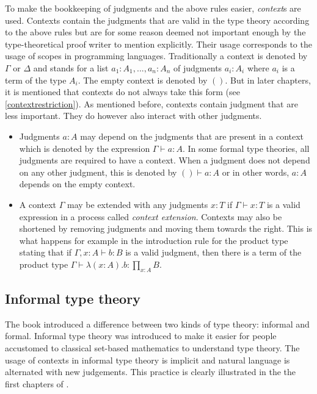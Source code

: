 \documentclass[11pt,a4paper,twoside,xetex,draft]{book}
\newcommand{\keyword}[1]{\emph{#1}\index{#1}}
\begin{document}
To make the bookkeeping of judgments and the above  rules easier, \keyword{context}s are used. Contexts contain the judgments that are valid in the type theory according to the above rules but are for some reason deemed not important enough by the type-theoretical proof writer to mention explicitly. Their usage corresponds to the usage of scopes in programming languages. Traditionally a context is denoted by $\Gamma$ or $\Delta$ and stands for a list $a_1:A_1,...,a_n:A_n$ of judgments $a_i : A_i$ where $a_i$ is a term of the type $A_i$.  The empty context is denoted by $()$. But in later chapters, it is mentioned that contexts do not always take this form (see \cref{contextrestriction}). As mentioned before, contexts contain judgment that are less important. They do however also interact with other judgments.

\begin{itemize}
\item Judgments $a : A$ may depend on the judgments that are present in a context which is denoted by the expression $\Gamma \vdash a : A$. In some formal type theories, all judgments are required to have a context. When a judgment does not depend on any other judgment, this is denoted by $() \vdash a : A$ or in other words, $a : A$ depends on the empty context.  
\item A context $\Gamma$ may be extended with any judgments $x:T$ if $\Gamma \vdash x : T$ is a valid expression in a process called \keyword{context extension}. Contexts may also be shortened by removing judgments and moving them towards the right. This is what happens for example in the introduction rule for the product type stating that if $\Gamma , x : A \vdash b : B$ is a valid judgment, then there is a term of the product type $\Gamma \vdash \lambda (x : A) . b : \prod_{x : A} B$.
\end{itemize}




\subsection{Informal type theory}

The book \cite{Voevodsky2013} introduced a difference between two kinds of type theory: informal and formal. Informal type theory was introduced to make it easier for people accustomed to classical set-based mathematics to understand type theory. The usage of contexts in informal type theory is implicit and natural language is alternated with new judgements. This practice is clearly illustrated in the the first chapters of \cite{Voevodsky2013}.
\end{document}
